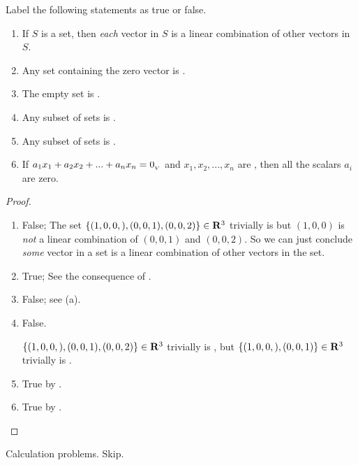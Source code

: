 \exercisesection

\begin{exercise} \label{exercise 1.5.1}
Label the following statements as true or false.
\begin{enumerate}
\item If \(S\) is a \LDP{} set, then \emph{each} vector in \(S\) is a linear combination of other vectors in \(S\).
\item Any set containing the zero vector is \LDP{}.
\item The empty set is \LDP{}.
\item Any subset of \LDP{} sets is \LDP{}.
\item Any subset of \LID{} sets is \LID{}.
\item If \(a_1 x_1 + a_2 x_2 + ... + a_n x_n = 0_{_V}\) and \(x_1, x_2, ..., x_n\) are \LID{}, then all the scalars \(a_i\) are zero.
\end{enumerate}
\end{exercise}

\begin{proof}\ 

\begin{enumerate}
\item False; The set \(\{(1, 0, 0,), (0, 0, 1), (0, 0, 2)\} \in \mathbf{R}^3\) trivially is \LDP{} but \((1, 0, 0)\) is \emph{not} a linear combination of \((0, 0, 1)\) and \((0, 0, 2)\).
      So we can just conclude \emph{some} vector in a \LDP{} set is a linear combination of other vectors in the set.
\item True; See the consequence of .
\item False; see (a).
\item False.

    \(\{(1, 0, 0,), (0, 0, 1), (0, 0, 2)\} \in \mathbf{R}^3\) trivially is \LDP{}, but \(\{(1, 0, 0,), (0, 0, 1)\} \in \mathbf{R}^3\) trivially is \LID{}.
\item True by .
\item True by .
\end{enumerate}
\end{proof}

\begin{exercise} \label{exercise 1.5.2}
Calculation problems. Skip.
\end{exercise}

